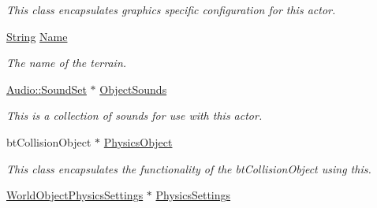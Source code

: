 \begin{DoxyCompactItemize}
\begin{DoxyCompactList}\small\item\em This class encapsulates graphics specific configuration for this actor. \item\end{DoxyCompactList}\item 
\hypertarget{classMezzanine_1_1WorldObject_a3ab67d5cc00b2d75aad716f2284a9721}{
\hyperlink{namespaceMezzanine_acf9fcc130e6ebf08e3d8491aebcf1c86}{String} \hyperlink{classMezzanine_1_1WorldObject_a3ab67d5cc00b2d75aad716f2284a9721}{Name}}
\label{classMezzanine_1_1WorldObject_a3ab67d5cc00b2d75aad716f2284a9721}

\begin{DoxyCompactList}\small\item\em The name of the terrain. \item\end{DoxyCompactList}\item 
\hypertarget{classMezzanine_1_1WorldObject_a49ae0e50ccc6dd17a1f02a607f3db55a}{
\hyperlink{classMezzanine_1_1Audio_1_1SoundSet}{Audio::SoundSet} $\ast$ \hyperlink{classMezzanine_1_1WorldObject_a49ae0e50ccc6dd17a1f02a607f3db55a}{ObjectSounds}}
\label{classMezzanine_1_1WorldObject_a49ae0e50ccc6dd17a1f02a607f3db55a}

\begin{DoxyCompactList}\small\item\em This is a collection of sounds for use with this actor. \item\end{DoxyCompactList}\item 
\hypertarget{classMezzanine_1_1WorldObject_a2403ba494a9835daddfbc68b118991bc}{
btCollisionObject $\ast$ \hyperlink{classMezzanine_1_1WorldObject_a2403ba494a9835daddfbc68b118991bc}{PhysicsObject}}
\label{classMezzanine_1_1WorldObject_a2403ba494a9835daddfbc68b118991bc}

\begin{DoxyCompactList}\small\item\em This class encapsulates the functionality of the btCollisionObject using this. \item\end{DoxyCompactList}\item 
\hypertarget{classMezzanine_1_1WorldObject_a0e9e31cc264f05d3fb2591cbf5883384}{
\hyperlink{classMezzanine_1_1WorldObjectPhysicsSettings}{WorldObjectPhysicsSettings} $\ast$ \hyperlink{classMezzanine_1_1WorldObject_a0e9e31cc264f05d3fb2591cbf5883384}{PhysicsSettings}}
\label{classMezzanine_1_1WorldObject_a0e9e31cc264f05d3fb2591cbf5883384}


\end{DoxyCompactItemize}
